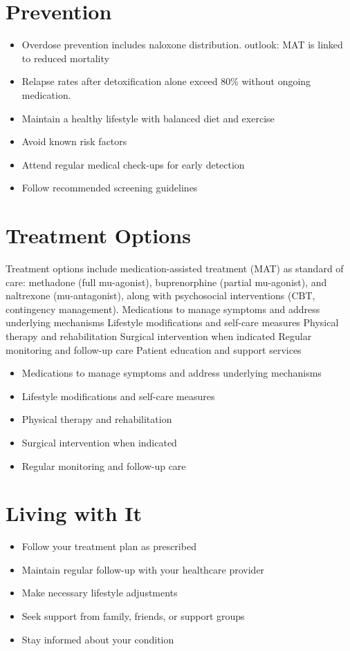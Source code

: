\section{Prevention}
\begin{itemize}[noitemsep]
  \item Overdose prevention includes naloxone distribution. outlook: MAT is linked to reduced mortality
  \item Relapse rates after detoxification alone exceed 80\% without ongoing medication.
  \item Maintain a healthy lifestyle with balanced diet and exercise
  \item Avoid known risk factors
  \item Attend regular medical check-ups for early detection
  \item Follow recommended screening guidelines
\end{itemize}
\section{Treatment Options}
Treatment options include medication-assisted treatment (MAT) as standard of care: methadone (full mu-agonist), buprenorphine (partial mu-agonist), and naltrexone (mu-antagonist), along with psychosocial interventions (CBT, contingency management). Medications to manage symptoms and address underlying mechanisms Lifestyle modifications and self-care measures Physical therapy and rehabilitation Surgical intervention when indicated Regular monitoring and follow-up care Patient education and support services

\begin{itemize}[noitemsep]
  \item Medications to manage symptoms and address underlying mechanisms
  \item Lifestyle modifications and self-care measures
  \item Physical therapy and rehabilitation
  \item Surgical intervention when indicated
  \item Regular monitoring and follow-up care
\end{itemize}
\section{Living with It}
\begin{itemize}[noitemsep]
  \item Follow your treatment plan as prescribed
  \item Maintain regular follow-up with your healthcare provider
  \item Make necessary lifestyle adjustments
  \item Seek support from family, friends, or support groups
  \item Stay informed about your condition
\end{itemize}
